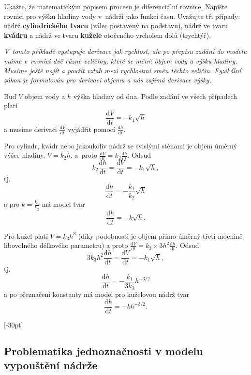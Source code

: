Ukažte, že matematickým popisem procesu je diferenciální rovnice.
Napište rovnici pro výšku hladiny vody v nádrži jako funkci času.
Uvažujte tři případy:
nádrž \textbf{cylindrického tvaru} (válec postavený na podstavu),
nádrž ve tvaru
\textbf{kvádru} 
a nádrž ve tvaru \textbf{kužele} otočeného vrcholem dolů (trychtýř). 


\textit{V tomto příkladě vystupuje derivace jak rychlost, ale po přepisu zadání do modelu máme v rovnici dvě různé veličiny, které se mění: objem vody a výšku hladiny. Musíme ještě najít a použít vztah mezi rychlostmi změn těchto veličin. Fyzikální zákon je formulován pro derivaci objemu a nás zajímá derivace výšky.}

\reseni
Buď $V$ objem vody a $h$ výška hladiny od dna.
Podle zadání ve všech případech platí $$\frac {\mathrm dV}{\mathrm dt}=-k_1\sqrt h$$ a musíme derivaci $\frac {\mathrm dV}{\mathrm dt}$ vyjádřit pomocí $\frac {\mathrm dh}{\mathrm dt}$.

Pro cylindr, kvádr nebo jakoukoliv nádrž se svislými stěnami je objem úměrný výšce hladiny, $V=k_2 h$, a proto $\frac {\mathrm dV}{\mathrm dt}=k_2\frac {\mathrm dh}{\mathrm dt}$. Odsud
$$k_2\frac {\mathrm dh}{\mathrm dt}=\frac {\mathrm dV}{\mathrm dt}=-k_1\sqrt h,$$
tj.
$$\frac {\mathrm dh}{\mathrm dt}=-\frac{k_1}{k_2}\sqrt h$$
a pro $k=\frac{k_1}{k_2}$ má model tvar
$$\frac {\mathrm dh}{\mathrm dt}=-k\sqrt h.$$

Pro kužel platí $V=k_3h^3$ (díky podobnosti je objem přímo úměrný třetí mocnině libovolného délkového parametru) a proto
$\frac {\mathrm dV}{\mathrm dt}=k_3 \times 3h^2 \frac {\mathrm dh}{\mathrm dt}$.
Odsud
$$3k_3 h^2 \frac {\mathrm dh}{\mathrm dt}=\frac {\mathrm dV}{\mathrm dt}=-k_1\sqrt h,$$
tj. 
$$\frac {\mathrm dh}{\mathrm dt}=-\frac{k_1}{3k_3}h^{-3/2}$$
a po přeznačení konstanty má model pro kuželovou nádrž tvar
$$\frac {\mathrm dh}{\mathrm dt}=-kh^{-3/2}.$$


\konec

\stranka
{}[-30pt]


\subsection{Problematika jednoznačnosti v modelu vypouštění nádrže}


